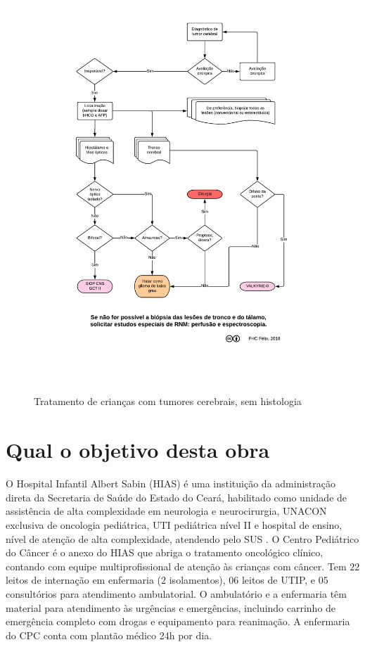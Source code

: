 \documentclass[graybox]{svmult}
\begin{document}
\begin{center}
\begin{figure}[!htb]
\includegraphics[scale=0.63,trim = 20mm 5mm 10mm 8mm,clip]{fig/fig2.pdf}
\caption{Tratamento de crianças com tumores cerebrais, sem histologia}
\end{figure}
\end{center}

\section{Qual o objetivo desta obra}
\label{sec:2}
O Hospital Infantil Albert Sabin (HIAS) é uma instituição da administração direta da Secretaria de Saúde do Estado do Ceará, habilitado como unidade de assistência de alta complexidade em neurologia e neurocirurgia, UNACON exclusiva de oncologia pediátrica, UTI pediátrica nível II e hospital de ensino, nível de atenção de alta complexidade, atendendo pelo SUS \cite{cnes}. O Centro Pediátrico do Câncer é o anexo do HIAS que abriga o tratamento oncológico clínico, contando com equipe multiprofissional de atenção às crianças com câncer. Tem \(22\) leitos de internação em enfermaria (\(2\) isolamentos), \(06\) leitos de UTIP, e \(05\) consultórios para atendimento ambulatorial. O ambulatório e a enfermaria têm material para atendimento às urgências e emergências, incluindo carrinho de emergência completo com drogas e equipamento para reanimação. A enfermaria do CPC conta com plantão médico 24h por dia.
\end{document}

